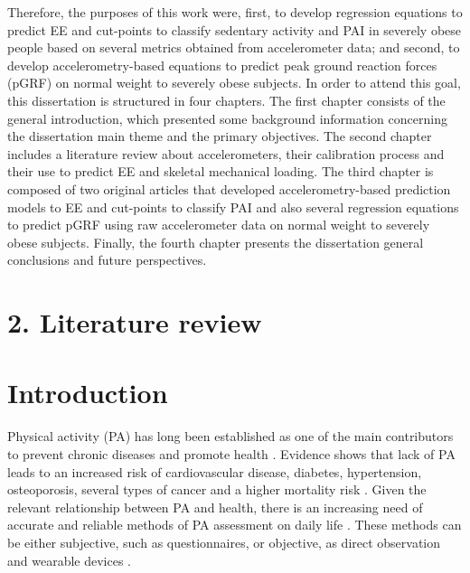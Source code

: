 \documentclass[12pt]{article}
\def\blankpage{%
      \clearpage%
      \thispagestyle{empty}%
      \addtocounter{page}{+0}%
      \null%
      \clearpage}
\begin{document}
Therefore, the purposes of this work were, first, to develop regression equations to predict EE and cut-points to classify sedentary activity and PAI in severely obese people based on several metrics obtained from accelerometer data; and second, to develop accelerometry-based equations to predict peak ground reaction forces (pGRF) on normal weight to severely obese subjects. In order to attend this goal, this dissertation is structured in four chapters. The first chapter consists of the general introduction, which presented some background information concerning the dissertation main theme and the primary objectives. The second chapter includes a literature review about accelerometers, their calibration process and their use to predict EE and skeletal mechanical loading. The third chapter is composed of two original articles that developed accelerometry-based prediction models to EE and cut-points to classify PAI and also several regression equations to predict pGRF using raw accelerometer data on normal weight to severely obese subjects. Finally, the fourth chapter presents the dissertation general conclusions and future perspectives.

\pagebreak

\pagebreak


\section*{\vfill\raggedleft\bfseries 2. Literature review}
\thispagestyle{empty} 
\blankpage

\section*{Introduction}

Physical activity (PA) has long been established as one of the main contributors to prevent chronic diseases and promote health . Evidence shows that lack of PA leads to an increased risk of cardiovascular disease, diabetes, hypertension, osteoporosis, several types of cancer and a higher mortality risk . Given the relevant relationship between PA and health, there is an increasing need of accurate and reliable methods of PA assessment on daily life . These methods can be either subjective, such as questionnaires, or objective, as direct observation and wearable devices .
\end{document}

